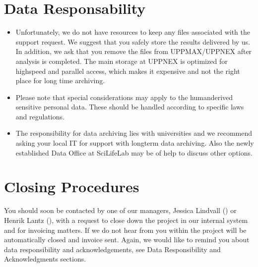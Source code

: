\documentclass[letterpaper,10pt,english]{sphinxmanual}
\begin{document}
\chapter{Data Responsability}
\label{\detokenize{content/data_responsability:data-responsability}}\label{\detokenize{content/data_responsability::doc}}\begin{itemize}
\item {} 
 Unfortunately, we do not have resources to keep any files associated with the support request. We suggest that you safely store the results delivered by us. In addition, we ask that you remove the files from UPPMAX/UPPNEX after analysis is completed. The main storage at UPPNEX is optimized for high\sphinxhyphen{}speed and parallel access, which makes it expensive and not the right place for long time archiving.

\item {} 
 Please note that special considerations may apply to the human\sphinxhyphen{}derived sensitive personal data. These should be handled according to specific laws and regulations.

\item {} 
 The responsibility for data archiving lies with universities and we recommend asking your local IT for support with long\sphinxhyphen{}term data archiving. Also the newly established Data Office at SciLifeLab may be of help to discuss other options.

\end{itemize}


\chapter{Closing Procedures}
\label{\detokenize{content/closing:closing-procedures}}\label{\detokenize{content/closing::doc}}
You should soon be contacted by one of our managers, Jessica Lindvall () or Henrik Lantz (), with a request to close down the project in our internal system and for invoicing matters. If we do not hear from you within  the project will be automatically closed and invoice sent. Again, we would like to remind you about data responsibility and acknowledgements, see Data Responsibility and Acknowledgments sections.
\end{document}
